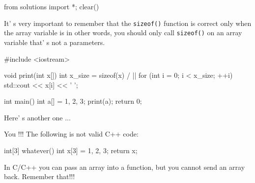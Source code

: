 \begin{python0}
from solutions import *; clear()
\end{python0}

It' s very important to remember that the \texttt{sizeof()} function is correct only when the array variable is  in other words, you should only call \texttt{sizeof()} on an array variable that' s not a parameters.

\begin{consolethree}[escapeinside=||]
#include <iostream>

void print(int x[])
{
    int x_size = sizeof(x) / ||
    for (int i = 0; i < x_size; ++i)
    {
        std::cout << x[i] << ' ';
    }
}

int main()
{
    int a[] = {1, 2, 3};
    print(a);
    return 0;
}
\end{consolethree}
Here' s another one ...

You !!! The following is not valid C++ code:

\begin{consolethree}[escapeinside=||]
int[3] whatever()
{
    int x[3] = {1, 2, 3};
    return x;
}
\end{consolethree}

In C/C++ you can pass an array into a function, but you cannot send an array back. Remember that!!!

